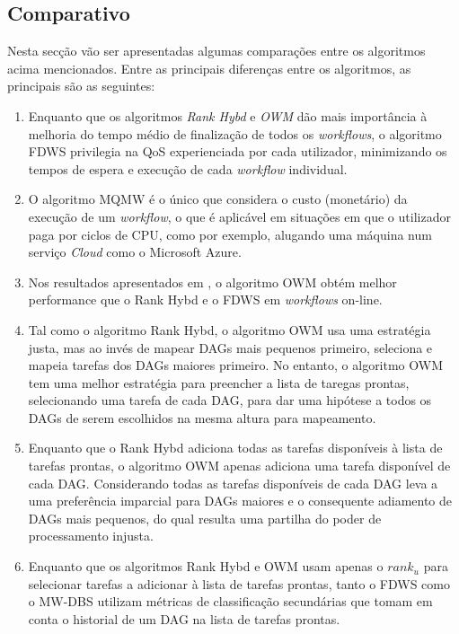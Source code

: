 \subsection{Comparativo}
Nesta secção vão ser apresentadas algumas comparações entre os algoritmos acima mencionados.
Entre as principais diferenças entre os algoritmos, as principais são as seguintes:
\begin{enumerate}
	\item Enquanto que os algoritmos \textit{Rank Hybd} e \textit{OWM} dão mais importância à melhoria do tempo médio de finalização de todos os \textit{workflows}, o algoritmo FDWS privilegia na QoS experienciada por cada utilizador, minimizando os tempos de espera e execução de cada \textit{workflow} individual.
	\item O algoritmo MQMW é o único que considera o custo (monetário) da execução de um \textit{workflow}, o que é aplicável em situações em que o utilizador paga por ciclos de CPU, como por exemplo, alugando uma máquina num serviço \textit{Cloud} como o Microsoft Azure.
	\item Nos resultados apresentados em \cite{Hsu2011}, o algoritmo OWM obtém melhor performance que o Rank Hybd e o FDWS em \textit{workflows} on-line. 
	\item Tal como o algoritmo Rank Hybd, o algoritmo OWM usa uma estratégia justa, mas ao invés de mapear DAGs mais pequenos primeiro, seleciona e mapeia tarefas dos DAGs maiores primeiro. No entanto, o algoritmo OWM tem uma melhor estratégia para preencher a lista de taregas prontas, selecionando uma tarefa de cada DAG, para dar uma hipótese a todos os DAGs de serem escolhidos na mesma altura para mapeamento.
	\item Enquanto que o Rank Hybd adiciona todas as tarefas disponíveis à lista de tarefas prontas, o algoritmo OWM apenas adiciona uma tarefa disponível de cada DAG. Considerando todas as tarefas disponíveis de cada DAG leva a uma preferência imparcial para DAGs maiores e o consequente adiamento de DAGs mais pequenos, do qual resulta uma partilha do poder de processamento injusta. 
	\item Enquanto que os algoritmos Rank Hybd e OWM usam apenas o $rank_u$ para selecionar tarefas a adicionar à lista de tarefas prontas, tanto o FDWS como o MW-DBS utilizam métricas de classificação secundárias que tomam em conta o historial de um DAG na lista de tarefas prontas.
\end{enumerate}
	
